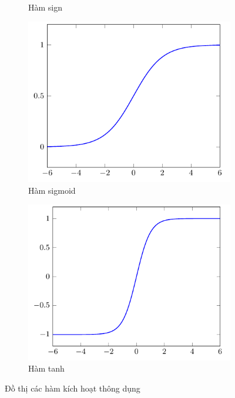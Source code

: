 \begin{figure}[htb]
\begin{subfigure}[b]{0.25\textwidth}
        \caption{Hàm sign}
    \end{subfigure}%
    \begin{subfigure}[b]{0.25\textwidth}
        \centering
        \includegraphics[width=\textwidth]{tikz_image/sigmoid.pdf}
        \caption{Hàm sigmoid}
    \end{subfigure}%
    \begin{subfigure}[b]{0.25\textwidth}
        \centering
        \includegraphics[width=\textwidth]{tikz_image/tanh.pdf}
        \caption{Hàm tanh}
    \end{subfigure}%
    \caption{Đồ thị các hàm kích hoạt thông dụng}
    \label{figure:activation-funtion-1}
\end{figure}
